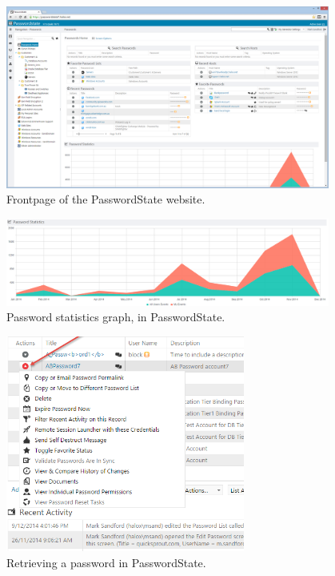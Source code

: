 			\begin{figure}[htbp]
				\centering
				\includegraphics[width=0.95\textwidth]{figures/analysis/passwordstate_main.png}
				\caption{Frontpage of the PasswordState website.  }
				\label{fig:passwordstate_main}
			\end{figure}

			\begin{figure}[htbp]
				\centering
				\includegraphics[width=0.95\textwidth]{figures/analysis/passwordstate_graph.png}
				\caption{Password statistics graph, in PasswordState. }
				\label{fig:passwordstate_graph}
			\end{figure}

			\begin{figure}[htbp]
				\centering
				\includegraphics[width=0.7\textwidth]{figures/analysis/passwordstate_getpassword.png}
				\caption{Retrieving a password in PasswordState. }
				\label{fig:passwordstate_getpassword}
			\end{figure}

